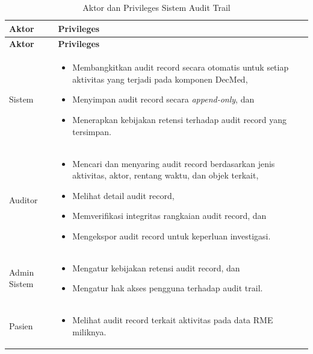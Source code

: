 \begin{xltabular}{\textwidth}{|>{\raggedright\arraybackslash}p{3.2cm}|X|}
    \caption{Aktor dan Privileges Sistem Audit Trail} \\
    \hline
    \textbf{Aktor} & \textbf{Privileges} \\
    \hline
    \endfirsthead
    \hline
    \textbf{Aktor} & \textbf{Privileges} \\
    \hline
    \endhead
    \hline
    \endfoot
    \hline
    \endlastfoot

    Sistem &
    \begin{itemize}
        \item Membangkitkan audit record secara otomatis untuk setiap aktivitas yang terjadi pada komponen DecMed,
        \item Menyimpan audit record secara \textit{append-only}, dan
        \item Menerapkan kebijakan retensi terhadap audit record yang tersimpan.
    \end{itemize} \\
    \hline

    Auditor &
    \begin{itemize}
        \item Mencari dan menyaring audit record berdasarkan jenis aktivitas, aktor, rentang waktu, dan objek terkait,
        \item Melihat detail audit record,
        \item Memverifikasi integritas rangkaian audit record, dan
        \item Mengekspor audit record untuk keperluan investigasi.
    \end{itemize} \\
    \hline

    Admin Sistem &
    \begin{itemize}
        \item Mengatur kebijakan retensi audit record, dan
        \item Mengatur hak akses pengguna terhadap audit trail.
    \end{itemize} \\
    \hline

    Pasien &
    \begin{itemize}
        \item Melihat audit record terkait aktivitas pada data RME miliknya.
    \end{itemize} \\
    \hline


\end{xltabular}
